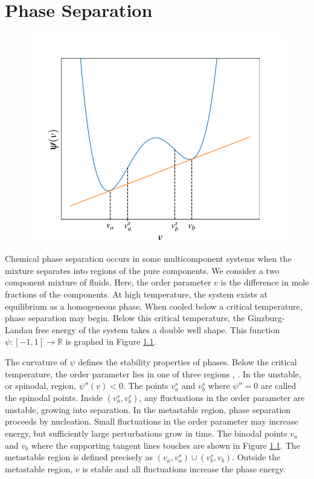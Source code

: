 \documentclass[12pt, reqno]{report}
\theoremstyle{definition}
\theoremstyle{remark}
\begin{document}
\chapter{Phase Separation} \label{sec_phase}

\begin{figure}
    \centering
    \vspace{-30pt}
      \includegraphics[width=.4\paperwidth]{media_paper/gen_well}
      \label{fg_gen_well}
\end{figure}
Chemical phase separation occurs in some multicomponent systems when the mixture separates into regions of the pure components.
We consider a two component mixture of fluids.
Here, the order parameter $v$ is the difference in mole fractions of the components.
At high temperature, the system exists at equilibrium as a homogeneous phase.
When cooled below a critical temperature, phase separation may begin.
Below this critical temperature, the Ginzburg-Landau free energy of the system takes a double well shape.
This function $\psi:[-1,1]\to\mathbb{R}$ is graphed in Figure \ref{fg_gen_well}. 

The curvature of $\psi$ defines the stability properties of phases. 
Below the critical temperature, the order parameter lies in one of three regions \cite{copetti_1990_kinetics}, \cite{novickcohen_1984_nonlinear}. 
In the unstable, or spinodal, region, $\psi''(v)<0$.
The points $v_a^s$ and $v_b^s$ where $\psi''=0$ are called the spinodal points. 
Inside $(v_a^s,v_b^s)$, any fluctuations in the order parameter are unstable, growing into separation.
In the metastable region, phase separation proceeds by nucleation. 
Small fluctuations in the order parameter may increase energy, but sufficiently large perturbations grow in time. 
The binodal points $v_a$ and $v_b$ where the supporting tangent lines touches are shown in Figure \ref{fg_gen_well}.
The metastable region is defined precisely as $(v_a,v_a^s)\cup(v_b^s,v_b)$.
Outside the metastable region, $v$ is stable and all fluctuations increase the phase energy.
\end{document}
